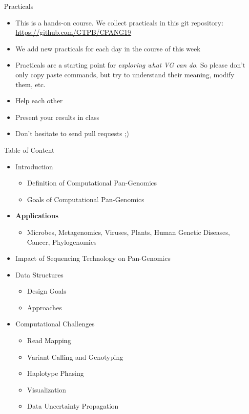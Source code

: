\documentclass[notes=hide]{beamer}
\newcommand{\0}{\ensuremath{\mathtt{0}}}
\newcommand{\1}{\ensuremath{\mathtt{1}}}
\begin{document}
\begin{frame}{Practicals}
\begin{itemize}
 \item This is a hands-on course. We collect practicals in this git repository: \url{https://github.com/GTPB/CPANG19}
 \item We add new practicals for each day in the course of this week
 \item Practicals are a starting point for \emph{exploring what VG can do}. So please don't only copy paste commands, but try to understand their meaning, modify them, etc.
 \item Help each other
 \item Present your results in class
 \item Don't hesitate to send pull requests ;) 
\end{itemize}
\end{frame}


\begin{frame}{Table of Content}
\begin{itemize}
 \item Introduction
 \begin{itemize}
    \item Definition of Computational Pan-Genomics
    \item Goals of Computational Pan-Genomics
 \end{itemize}
\item {\color{red}\textbf{Applications}}
 \begin{itemize}
    \item Microbes, Metagenomics, Viruses, Plants, Human Genetic Diseases, Cancer, Phylogenomics
 \end{itemize}
\item Impact of Sequencing Technology on Pan-Genomics
\item Data Structures
 \begin{itemize}
    \item Design Goals
    \item Approaches
 \end{itemize}
\item Computational Challenges
 \begin{itemize}
    \item Read Mapping
    \item Variant Calling and Genotyping
    \item Haplotype Phasing
    \item Visualization
    \item Data Uncertainty Propagation
 \end{itemize}
\end{itemize}
\end{frame}
\end{document}
